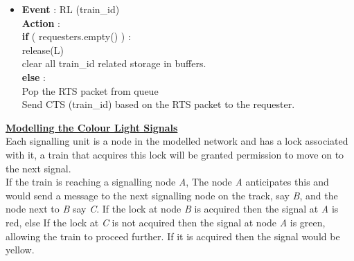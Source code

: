 \documentclass[twoside,11pt]{article}
\begin{document}
\begin{framed}
\begin{itemize}
	\item {\bf Event } : RL (train\_id) \\
		  {\bf Action }: \\
		  
	{\bf if}  ( requesters.empty() ) : \\
	 \indent \hspace{0.1in}     release(L) \\
	 \indent \hspace{0.1in}   clear all train\_id related storage in buffers. \\
	{\bf else} : \\
	 \indent \hspace{0.1in} Pop the RTS packet from queue \\
     \indent \hspace{0.1in} Send CTS (train\_id) based on the RTS packet to the requester. \\


\end{itemize}
\end{framed}


\noindent\underline{\bf Modelling the Colour Light Signals  } \vspace{0.1in} \\
Each signalling unit is a node in the modelled network and has a lock associated
with it, a train that acquires this lock will be granted permission to move on
to the next signal. \\
If the train is reaching a signalling node {\em A}, The node {\em A} anticipates this and would send a message to the next signalling node on the track, say {\em B}, and the node next to {\em B} say {\em C}. If the lock at node {\em B} is acquired then the signal at {\em A} is red, else If the lock at {\em C} is not acquired then the signal at 
node {\em A} is green, allowing the train to proceed further. If it is acquired then 
the signal would be yellow. \\
\end{document}
